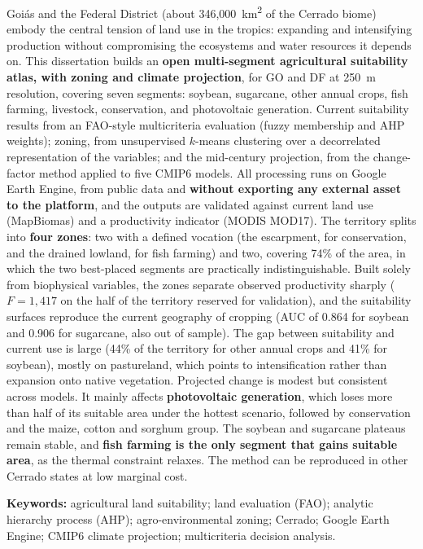 Goiás and the Federal District (about 346,000~km\textsuperscript{2} of the Cerrado biome)
embody the central tension of land use in the tropics: expanding and intensifying production
without compromising the ecosystems and water resources it depends on. This dissertation builds an
\textbf{open multi-segment agricultural suitability atlas, with zoning and climate projection}, for
GO and DF at 250~m resolution, covering seven segments: soybean, sugarcane, other annual crops, fish
farming, livestock, conservation, and photovoltaic generation. Current suitability results from an
FAO-style multicriteria evaluation (fuzzy membership and AHP weights); zoning, from unsupervised
$k$-means clustering over a decorrelated representation of the variables; and the mid-century
projection, from the change-factor method applied to five CMIP6 models. All processing runs on Google
Earth Engine, from public data and \textbf{without exporting any external asset to the platform}, and
the outputs are validated against current land use (MapBiomas) and a productivity indicator (MODIS
MOD17). The territory splits into \textbf{four zones}: two with a defined vocation (the escarpment, for
conservation, and the drained lowland, for fish farming) and two, covering 74\% of the area, in which
the two best-placed segments are practically indistinguishable. Built solely from biophysical
variables, the zones separate observed productivity sharply ($F = 1{,}417$ on the half of the territory
reserved for validation), and the suitability surfaces reproduce the current geography of cropping
(AUC of 0.864 for soybean and 0.906 for sugarcane, also out of sample). The gap between suitability and
current use is large (44\% of the territory for other annual crops and 41\% for soybean), mostly on
pastureland, which points to intensification rather than expansion onto native vegetation. Projected
change is modest but consistent across models. It mainly affects \textbf{photovoltaic generation},
which loses more than half of its suitable area under the hottest scenario, followed by conservation
and the maize, cotton and sorghum group. The soybean and sugarcane plateaus remain stable, and
\textbf{fish farming is the only segment that gains suitable area}, as the thermal constraint relaxes.
The method can be reproduced in other Cerrado states at low marginal cost.

\vspace{0.4em}
\noindent\textbf{Keywords:} agricultural land suitability; land evaluation (FAO);
analytic hierarchy process (AHP); agro-environmental zoning; Cerrado; Google Earth Engine;
CMIP6 climate projection; multicriteria decision analysis.
